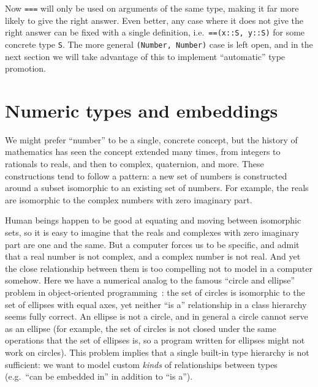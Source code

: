 \noindent
Now \texttt{===} will only be used on arguments of the same type,
making it far more likely to give the right answer.
Even better, any case where it does not give the right answer can be fixed with
a single definition, i.e.\ \texttt{==(x::S, y::S)} for some
concrete type \texttt{S}.
The more general \texttt{(Number, Number)} case is left open, and in the next
section we will take advantage of this to implement ``automatic'' type promotion.



\section{Numeric types and embeddings}

We might prefer ``number'' to be a single, concrete concept, but the history of
mathematics has seen the concept extended many times, from integers to rationals to
reals, and then to complex, quaternion, and more.
These constructions tend to follow a pattern: a new set of numbers is constructed
around a subset isomorphic to an existing set of numbers.
For example, the reals are isomorphic to the complex numbers with zero imaginary part.

Human beings happen to be good at equating and moving between isomorphic sets,
so it is easy to imagine that the reals and complexes with zero imaginary
part are one and the same.
But a computer forces us to be specific, and admit
that a real number is not complex, and a complex number is not real.
And yet the close relationship between them is too compelling not to model in a
computer somehow.
Here we have a numerical analog to the famous ``circle and ellipse'' problem in
object-oriented programming~\cite{cline1995c++}: the set of circles is
isomorphic to the set of ellipses with equal axes, yet neither ``is a''
relationship in a class hierarchy seems fully correct.
An ellipse is not a circle, and in general a circle cannot serve as an ellipse
(for example, the set of circles is not closed under the same operations that the
set of ellipses is, so a program written for ellipses might not work on circles).
This problem implies that a single built-in type hierarchy is not
sufficient: we want to model custom \emph{kinds} of relationships between
types (e.g.\ ``can be embedded in'' in addition to ``is a'').


